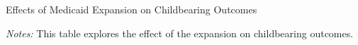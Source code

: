 \documentclass{article}
\begin{document}
\newpage
\begin{table}[h!]
\begin{centering}
\singlespacing
\caption{Effects of Medicaid Expansion on Childbearing Outcomes}
\label{tab:child_did}
\end{centering}
\begin{spacing}{1}
\begin{footnotesize}

\textit{Notes:} This table explores the effect of the expansion on childbearing outcomes.
\end{footnotesize}
\end{spacing}
\end{table}
\end{document}

